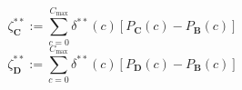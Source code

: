 \begin{equation}
	\zeta_\textbf{C}^{**} := \sum_{c = 0}^{C_\text{max}} \delta^{**}(c) \left[P_\textbf{C}(c) - P_\textbf{B}(c)\right]
	\label{ch4:equ:utilisation-metric-c}
\end{equation}
\begin{equation}
	\zeta_\textbf{D}^{**} := \sum_{c = 0}^{C_\text{max}} \delta^{**}(c) \left[P_\textbf{D}(c) - P_\textbf{B}(c)\right]
	\label{ch4:equ:utilisation-metric-d}
\end{equation}
